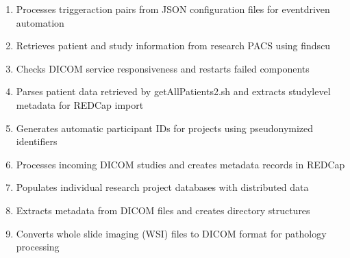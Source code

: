 \documentclass[letterpaper,10pt,english]{sphinxmanual}
\begin{document}
\begin{enumerate}
\item {} 
\sphinxAtStartPar
{\hyperref[\detokenize{Architecture/scripts/cron::doc}]{}} \sphinxhyphen{} Processes trigger\sphinxhyphen{}action pairs from JSON configuration files for event\sphinxhyphen{}driven automation

\item {} 
\sphinxAtStartPar
{\hyperref[\detokenize{Architecture/scripts/getAllPatients2::doc}]{}} \sphinxhyphen{} Retrieves patient and study information from research PACS using findscu

\item {} 
\sphinxAtStartPar
{\hyperref[\detokenize{Architecture/scripts/heartbeat::doc}]{}} \sphinxhyphen{} Checks DICOM service responsiveness and restarts failed components

\item {} 
\sphinxAtStartPar
{\hyperref[\detokenize{Architecture/scripts/parseAllPatients::doc}]{}} \sphinxhyphen{} Parses patient data retrieved by getAllPatients2.sh and extracts study\sphinxhyphen{}level metadata for REDCap import

\item {} 
\sphinxAtStartPar
{\hyperref[\detokenize{Architecture/scripts/populateAutoID::doc}]{}} \sphinxhyphen{}  Generates automatic participant IDs for projects using pseudonymized identifiers

\item {} 
\sphinxAtStartPar
{\hyperref[\detokenize{Architecture/scripts/populateIncoming::doc}]{}} \sphinxhyphen{} Processes incoming DICOM studies and creates metadata records in REDCap

\item {} 
\sphinxAtStartPar
{\hyperref[\detokenize{Architecture/scripts/populateProjects::doc}]{}} \sphinxhyphen{} Populates individual research project databases with distributed data

\item {} 
\sphinxAtStartPar
{\hyperref[\detokenize{Architecture/scripts/processSingleFile3::doc}]{}} \sphinxhyphen{} Extracts metadata from DICOM files and creates directory structures

\item {} 
\sphinxAtStartPar
{\hyperref[\detokenize{Architecture/scripts/process_tiff::doc}]{}} \sphinxhyphen{} Converts whole slide imaging (WSI) files to DICOM format for pathology processing


\end{enumerate}
\end{document}
